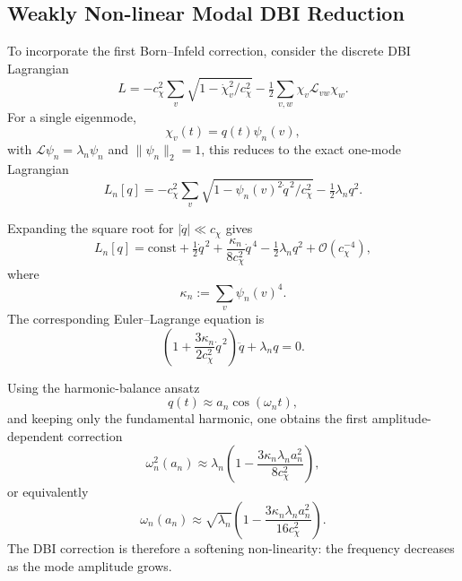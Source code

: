 \documentclass[11pt,a4paper]{article}
\begin{document}
  \subsection{Weakly Non-linear Modal DBI Reduction}
    \label{subsec:weakly-nonlinear-dbi}

    To incorporate the first Born--Infeld correction, consider the discrete DBI
    Lagrangian
    \begin{equation}
      \label{eq:dbi-lagrangian}
      L
      =
      -c_\chi^2 \sum_v \sqrt{1 - \dot{\chi}_v^2/c_\chi^2}
      - \tfrac{1}{2} \sum_{v,w} \chi_v \mathcal{L}_{vw} \chi_w.
    \end{equation}
    For a single eigenmode,
    \begin{equation}
      \chi_v(t) = q(t)\psi_n(v),
    \end{equation}
    with $\mathcal{L}\psi_n = \lambda_n \psi_n$ and $\|\psi_n\|_2 = 1$, this reduces to
    the exact one-mode Lagrangian
    \begin{equation}
      \label{eq:exact-mode-lagrangian}
      L_n[q]
      =
      -c_\chi^2 \sum_v \sqrt{1 - \psi_n(v)^2 \dot{q}^{\,2}/c_\chi^2}
      - \tfrac{1}{2}\lambda_n q^2.
    \end{equation}

    Expanding the square root for $|\dot{q}| \ll c_\chi$ gives
    \begin{equation}
      \label{eq:mode-lagrangian-expansion}
      L_n[q]
      =
      \mathrm{const}
      + \tfrac{1}{2}\dot{q}^{\,2}
      + \frac{\kappa_n}{8c_\chi^2}\dot{q}^{\,4}
      - \tfrac{1}{2}\lambda_n q^2
      + \mathcal{O}(c_\chi^{-4}),
    \end{equation}
    where
    \begin{equation}
      \label{eq:kappa-def}
      \kappa_n := \sum_v \psi_n(v)^4.
    \end{equation}
    The corresponding Euler--Lagrange equation is
    \begin{equation}
      \label{eq:weakly-nonlinear-mode-equation}
      \left(
        1 + \frac{3\kappa_n}{2c_\chi^2}\dot{q}^{\,2}
      \right)\ddot{q}
      + \lambda_n q
      = 0.
    \end{equation}

    Using the harmonic-balance ansatz
    \begin{equation}
      q(t) \approx a_n \cos(\omega_n t),
    \end{equation}
    and keeping only the fundamental harmonic, one obtains the first
    amplitude-dependent correction
    \begin{equation}
      \label{eq:omega-shift-square}
      \omega_n^2(a_n)
      \approx
      \lambda_n
      \left(
        1 - \frac{3\kappa_n\lambda_n a_n^2}{8c_\chi^2}
      \right),
    \end{equation}
    or equivalently
    \begin{equation}
      \label{eq:omega-shift}
      \omega_n(a_n)
      \approx
      \sqrt{\lambda_n}
      \left(
        1 - \frac{3\kappa_n\lambda_n a_n^2}{16c_\chi^2}
      \right).
    \end{equation}
    The DBI correction is therefore a softening non-linearity: the frequency
    decreases as the mode amplitude grows.
\end{document}

